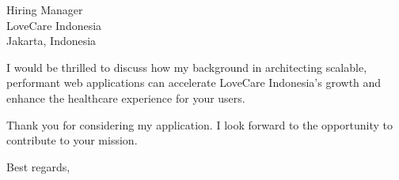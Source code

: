 \documentclass[11pt,a4paper]{letter}
\begin{document}
\begin{letter}{%
    Hiring Manager \\
    LoveCare Indonesia \\
    Jakarta, Indonesia
}
\vspace{10pt}

I would be thrilled to discuss how my background in architecting scalable, performant web applications can accelerate LoveCare Indonesia's growth and enhance the healthcare experience for your users.

\vspace{10pt}

Thank you for considering my application. I look forward to the opportunity to contribute to your mission.

\closing{Best regards,}

\end{letter}
\end{document}
